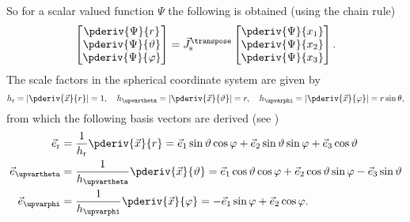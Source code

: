 So for a scalar valued function $\Psi$ the following is obtained (using the chain rule)
\begin{equation}
\label{Eq1:derivativesInSphericalCoordinates}
	\begin{bmatrix}
		\pderiv{\Psi}{r}\\
		\pderiv{\Psi}{\vartheta}\\
		\pderiv{\Psi}{\varphi}
	\end{bmatrix} = \vec{J}_{\mathrm{s}}^{\transpose} 
	\begin{bmatrix}
		\pderiv{\Psi}{x_1}\\
		\pderiv{\Psi}{x_2}\\
		\pderiv{\Psi}{x_3}
	\end{bmatrix}.
\end{equation}
The scale factors in the spherical coordinate system are given by
\begin{equation}
	h_{\mathrm{r}} = \left|\pderiv{\vec{x}}{r}\right| = 1,\quad h_\upvartheta = \left|\pderiv{\vec{x}}{\vartheta}\right| = r,\quad h_\upvarphi = \left|\pderiv{\vec{x}}{\varphi}\right| = r\sin\theta,
\end{equation}
from which the following basis vectors are derived (see )
\begin{align}
	\vec{e}_{\mathrm{r}} &= \frac{1}{h_{\mathrm{r}}}\pderiv{\vec{x}}{r} = \vec{e}_1\sin\vartheta\cos\varphi + \vec{e}_2\sin\vartheta\sin\varphi + \vec{e}_3\cos\vartheta\\
	\vec{e}_{\upvartheta} &= \frac{1}{h_\upvartheta}\pderiv{\vec{x}}{\vartheta} = \vec{e}_1\cos\vartheta\cos\varphi + \vec{e}_2\cos\vartheta\sin\varphi - \vec{e}_3\sin\vartheta\\
	\vec{e}_{\upvarphi} &= \frac{1}{h_\upvarphi}\pderiv{\vec{x}}{\varphi} = -\vec{e}_1\sin\varphi + \vec{e}_2\cos\varphi.
\end{align}
